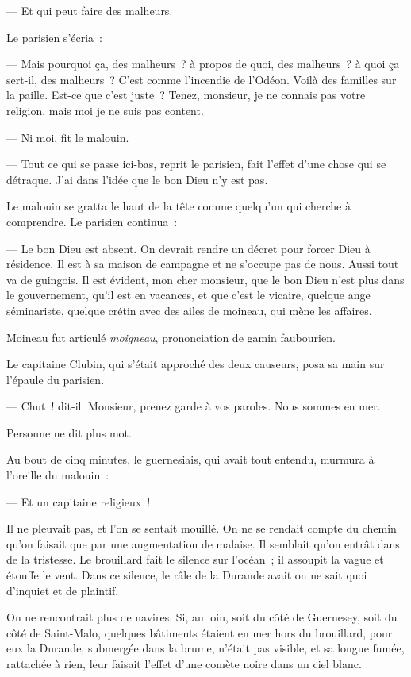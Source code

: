 \documentclass[french,twoside]{book} %
\begin{document}
— Et qui peut faire des malheurs.\par
Le parisien s’écria :\par
— Mais pourquoi ça, des malheurs ? à propos de quoi, des malheurs ? à quoi ça sert-il, des malheurs ? C’est comme l’incendie de l’Odéon. Voilà des familles sur la paille. Est-ce que c’est juste ? Tenez, monsieur, je ne connais pas votre religion, mais moi je ne suis pas content.\par
— Ni moi, fit le malouin.\par
— Tout ce qui se passe ici-bas, reprit le parisien, fait l’effet d’une chose qui se détraque. J’ai dans l’idée que le bon Dieu n’y est pas.\par
Le malouin se gratta le haut de la tête comme  quelqu’un qui cherche à comprendre. Le parisien continua :\par
— Le bon Dieu est absent. On devrait rendre un décret pour forcer Dieu à résidence. Il est à sa maison de campagne et ne s’occupe pas de nous. Aussi tout va de guingois. Il est évident, mon cher monsieur, que le bon Dieu n’est plus dans le gouvernement, qu’il est en vacances, et que c’est le vicaire, quelque ange séminariste, quelque crétin avec des ailes de moineau, qui mène les affaires.\par
Moineau fut articulé \emph{moigneau}, prononciation de gamin faubourien.\par
Le capitaine Clubin, qui s’était approché des deux causeurs, posa sa main sur l’épaule du parisien.\par
— Chut ! dit-il. Monsieur, prenez garde à vos paroles. Nous sommes en mer.\par
Personne ne dit plus mot.\par
Au bout de cinq minutes, le guernesiais, qui avait tout entendu, murmura à l’oreille du malouin :\par
— Et un capitaine religieux !\par
Il ne pleuvait pas, et l’on se sentait mouillé. On ne se rendait compte du chemin qu’on faisait que par une augmentation de malaise. Il semblait qu’on entrât dans de la tristesse. Le brouillard fait le silence sur l’océan ; il assoupit la vague et étouffe le vent. Dans ce silence, le râle de la Durande avait on ne sait quoi d’inquiet et de plaintif.\par
On ne rencontrait plus de navires. Si, au loin, soit du côté de Guernesey, soit du côté de Saint-Malo, quelques bâtiments étaient en mer hors du  brouillard, pour eux la Durande, submergée dans la brume, n’était pas visible, et sa longue fumée, rattachée à rien, leur faisait l’effet d’une comète noire dans un ciel blanc.\par
\end{document}
